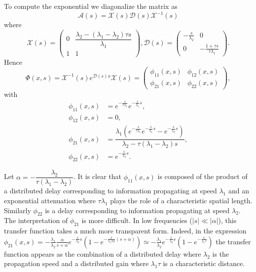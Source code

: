 \documentclass[5p,twocolumn]{elsarticle}
\begin{document}
To compute the exponential we diagonalize the matrix as 
\begin{equation}
\mathscr{A}(s) = \mathscr{X}(s)\mathscr{D}(s)\mathscr{X}^{-1}(s)
\end{equation}
where
\begin{equation}
\mathscr{X}(s) = \begin{pmatrix}
0 & \dfrac{\lambda_2 - (\lambda_1 - \lambda_2) \tau s}{\lambda_1} \\
1 & 1
\end{pmatrix},
\mathscr{D}(s) = \begin{pmatrix}
-\frac{s}{\lambda_2} & 0 \\
 0 & -\frac{1+\tau s}{\tau \lambda_1}
\end{pmatrix}.
\end{equation}
Hence
\begin{equation}
\Phi(x,s) =  \mathscr{X}^{-1}(s)e^{\mathscr{D}(s)x}\mathscr{X}(s) =
\begin{pmatrix}
\phi_{11}(x,s) & \phi_{12}(x,s) \\ 
\phi_{21}(x,s) & \phi_{22}(x,s)
\end{pmatrix},
\end{equation}
with
\begin{subequations} \label{TFv0q0tovxqx}
\begin{align}
\phi_{11}(x,s) &= e^{-\frac{x}{\tau \lambda_1}}e^{-\frac{x}{\lambda_1}s}, \\ 
\phi_{12}(x,s) &= 0, \\
\phi_{21}(x,s) &= \dfrac{\lambda_1 \left( e^{-\frac{x}{\tau \lambda_1}}e^{-\frac{x}{\lambda_1}s} - e^{-\frac{x}{\lambda_2}s}\right)}{\lambda_2 - \tau (\lambda_1 - \lambda_2)s}, \\
\phi_{22}(x,s) &= e^{-\frac{x}{\lambda_2}s}.
\end{align}
\end{subequations}



Let $\alpha = -\dfrac{\lambda_2}{\tau(\lambda_1 - \lambda_2)}$. It is clear that $\phi_{11}\left(x,s\right)$ is composed of the product of a distributed delay corresponding to information propagating at speed $\lambda_{1}$ and an exponential attenuation where $\tau\lambda_{1}$ plays the role of a characteristic spatial length. Similarly $\phi_{22}$ is a delay corresponding to information propagating at speed $\lambda_{2}$. The interpretation of $\phi_{21}$ is more difficult. In low frequencies ($\left|s\right|\ll\left|\alpha\right|$), this transfer function takes a much more transparent form. Indeed, in the expression
$
\phi_{21}(x,s) = 
-\frac{\lambda_{1}}{\lambda_{2}}\frac{\alpha}
{s + \alpha}
e^{-\frac{x}{\lambda_2}s}
	\left(
		1 - e^{-\frac{x}{\lambda_1 \tau \alpha}\left(s + \alpha\right)}
	\right)
\simeq 
- \frac{\lambda_{1}}{\lambda_{2}} e^{-\frac{x}{\lambda_2}s}
	\left(
		1 - e^{-\frac{x}{\lambda_1 \tau}}
	\right)
$
the transfer function appears as the combination of a distributed delay where $\lambda_{2}$ is the propagation speed and a distributed gain where $\lambda_{1}\tau$ is a characteristic distance.
\end{document}
